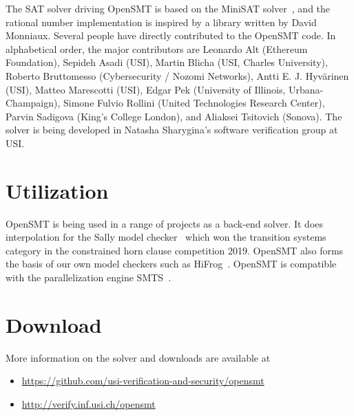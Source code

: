 \documentclass{article}
\begin{document}
The SAT solver driving OpenSMT is based on the MiniSAT
solver~\cite{EenS:SAT03}, and the rational number implementation is
inspired by a library written by David Monniaux.  Several people have
directly contributed to the OpenSMT code.  In alphabetical order, the
major contributors are
%
Leonardo Alt (Ethereum Foundation),
Sepideh Asadi (USI),
Martin Blicha (USI, Charles University),
Roberto Bruttomesso (Cybersecurity / Nozomi Networks),
Antti E. J. Hyv{\"a}rinen (USI),
Matteo Marescotti (USI),
Edgar Pek (University of Illinois, Urbana-Champaign),
Simone Fulvio Rollini (United Technologies Research Center),
Parvin Sadigova (King's College London), and
Aliaksei Tsitovich (Sonova).
%
The solver is being developed in Natasha Sharygina's software
verification group at USI.

\section{Utilization}

OpenSMT is being used in a range of projects as a back-end solver.  It
does interpolation for the Sally model checker~\cite{JovanovicD:FMCAD16}
which won the transition systems category in the constrained horn clause
competition 2019.  OpenSMT also forms the basis of our own model
checkers such as HiFrog~\cite{AltACMFHS17}.  OpenSMT is compatible with
the parallelization engine SMTS~\cite{MarescottiHS18}.

\section{Download}
More information on the solver and downloads are available at

\begin{itemize}
    \item \url{https://github.com/usi-verification-and-security/opensmt}
    \item \url{http://verify.inf.usi.ch/opensmt}
\end{itemize}

\iffalse
in chronological order, work on interpolation 
algorithms~\cite{BlichaHKS19,AltHAS17,JancikAFHKS16,AsadiBFHESC18}
and parallel SMT 
solving~\cite{HyvarinenMSCS18,MarescottiHS18,HyvarinenMS:SAT15}.
OpenSMT2 is
used as the back-end in model-checking tools
HiFrog~\cite{AltACMFHS17},
eVolCheck~\cite{FSS_TACAS13}, 
FunFrog~\cite{SFS_ATVA12}, and
PeRIPLO~\cite{RolliniAFHS:LPAR2013,AltFHS:VSTTE2015}.
OpenSMT2 is a supported engine in the parallel 
solving framework SMTS~\cite{MarescottiHS16}.

\section{Acknowledgements}
We thank everyone who helped
developing OpenSMT2. In particular,
Leonardo Alt,
Sepideh Asadi,
Martin Blicha,
Roberto Bruttomesso,
Antti E. J. Hyv{\"a}rinen,
Matteo Marescotti,
Edgar Pek,
Simone Fulvio Rollini, 
Parvin Sadigova,
Natasha Sharygina,
Aliaksei Tsitovich.
\fi



\end{document}
